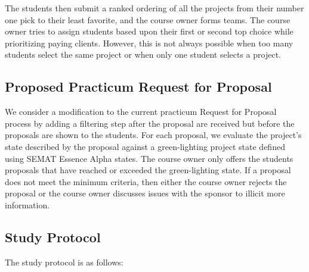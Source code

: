 \documentclass[conference]{IEEEtran}
\begin{document}
The students then submit a ranked ordering of all the projects from
their number one pick to their least favorite, and the course owner
forms teams. The course owner tries to assign students based upon their
first or second top choice while prioritizing paying clients. However,
this is not always possible when too many students select the same
project or when only one student selects a project.

\subsection{Proposed Practicum Request for Proposal}

We consider a modification to the current practicum Request for
Proposal process by adding a filtering step after the proposal are
received but before the proposals are shown to the students. For each
proposal, we evaluate the project's state described by the proposal
against a green-lighting project state defined using SEMAT Essence Alpha
states. The course owner only offers the students proposals that have
reached or exceeded the green-lighting state. If a proposal does not
meet the minimum criteria, then either the course owner rejects the
proposal or the course owner discusses issues with the sponsor to
illicit more information.

\subsection{Study Protocol}

The study protocol is as follows:
\end{document}
